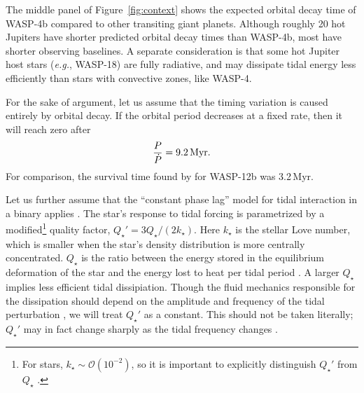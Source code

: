 \documentclass[12pt,twocolumn,tighten]{aastex62}
\begin{document}
The middle panel of Figure~\ref{fig:context} shows the expected
orbital decay time of WASP-4b compared to other transiting giant
planets.  Although roughly 20 hot Jupiters have shorter predicted
orbital decay times than WASP-4b, most have shorter observing
baselines.  A separate consideration is that some hot Jupiter host
stars ({\it e.g.}, WASP-18) are fully radiative, and may dissipate
tidal energy less efficiently than stars with convective zones, like
WASP-4.

For the sake of argument, let us assume that the timing variation is
caused entirely by orbital decay.  If the orbital period decreases
at a fixed rate, then it will reach zero after
\begin{equation}
  \frac{P}{ \dot{P} } = 9.2 \, {\rm Myr}.
\end{equation}
For comparison, the survival time found by \citet{patra_2017} for
WASP-12b was 3.2\,Myr.

Let us further assume that the ``constant phase lag'' model for tidal
interaction in a binary applies \citep{zahn_tidal_1977}.  The star's
response to tidal forcing is parametrized by a modified\footnote{For
stars, $k_\star \sim \mathcal{O}(10^{-2})$, so it is important to
explicitly distinguish $Q_\star'$ from $Q_\star$ \citep[{\it
e.g.},][]{schwarzschild_structure_1958}.} quality factor, $Q_\star' =
3 Q_\star / (2k_\star)$.  Here $k_\star$ is the stellar Love number,
which is smaller when the star's density distribution is more
centrally concentrated. $Q_\star$ is the ratio between the energy
stored in the equilibrium deformation of the star and the energy lost
to heat per tidal period \citep[{\it e.g.},][]{goldreich_q_1966}.  A
larger $Q_\star$ implies less efficient tidal dissipiation.  Though
the fluid mechanics responsible for the dissipation should depend on
the amplitude and frequency of the tidal perturbation
\citep[][Section~3.3]{ogilvie_tidal_2014}, we will treat $Q_\star'$ as
a constant.  This should not be taken literally; $Q_\star'$ may in
fact change sharply as the tidal frequency changes
\citep{penev_empirical_2018}.
\end{document}
